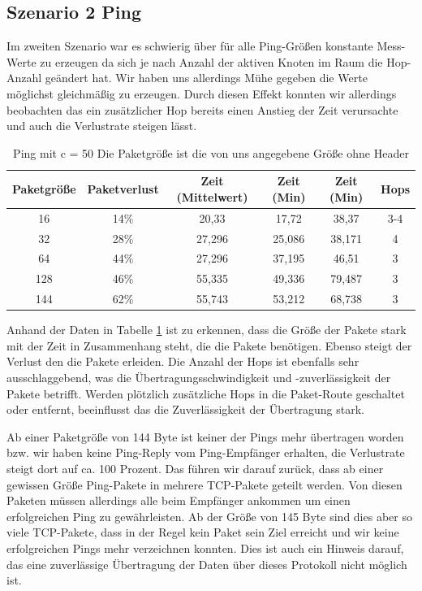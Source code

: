 \documentclass[]{scrartcl}
\begin{document}
\subsection{Szenario 2 Ping}

Im zweiten Szenario war es schwierig über für alle Ping-Größen konstante Mess-Werte zu erzeugen da sich je nach Anzahl der aktiven Knoten im Raum die Hop-Anzahl geändert hat. Wir haben uns allerdings Mühe gegeben die Werte möglichst gleichmäßig zu erzeugen. Durch diesen Effekt konnten wir allerdings beobachten das ein zusätzlicher Hop bereits einen Anstieg der Zeit verursachte und auch die Verlustrate steigen lässt.

\begin{table}[H]
\centering
\begin{tabular}{|c|c|c|c|c|c|}
  \hline
  \textbf{Paketgröße} & \textbf{Paketverlust} & \textbf{Zeit (Mittelwert)} & \textbf{Zeit (Min)} & \textbf{Zeit (Min)} & \textbf{Hops} \\
  \hline
   16 & 14\% & 20,33 & 17,72 & 38,37 & 3-4\\
  \hline
   32 & 28\% & 27,296 & 25,086 & 38,171 & 4\\
  \hline
   64 & 44\% & 27,296 & 37,195 & 46,51 & 3\\
  \hline
   128 & 46\% & 55,335 & 49,336 & 79,487 & 3\\
  \hline
   144 & 62\% & 55,743 & 53,212 & 68,738 & 3\\
  \hline
\end{tabular}
	\caption{Ping mit c = 50 Die Paketgröße ist die von uns angegebene Größe ohne Header}
	\label{table_ping_result_scenario2}
\end{table}

Anhand der Daten in Tabelle \ref{table_ping_result_scenario2} ist zu erkennen, dass die Größe der Pakete stark mit der Zeit in Zusammenhang steht, die die Pakete benötigen. Ebenso steigt der Verlust den die Pakete erleiden. Die Anzahl der Hops ist ebenfalls sehr ausschlaggebend, was die Übertragungsschwindigkeit und -zuverlässigkeit der Pakete betrifft. Werden plötzlich zusätzliche Hops in die Paket-Route geschaltet oder entfernt, beeinflusst das die Zuverlässigkeit der Übertragung stark.

Ab einer Paketgröße von 144 Byte ist keiner der Pings mehr übertragen worden bzw. wir haben keine Ping-Reply vom Ping-Empfänger erhalten, die Verlustrate steigt dort auf ca. 100 Prozent. Das führen wir darauf zurück, dass ab einer gewissen Größe Ping-Pakete in mehrere TCP-Pakete geteilt werden. Von diesen Paketen müssen allerdings alle beim Empfänger ankommen um einen erfolgreichen Ping zu gewährleisten. Ab der Größe von 145 Byte sind dies aber so viele TCP-Pakete, dass in der Regel kein Paket sein Ziel erreicht und wir keine erfolgreichen Pings mehr verzeichnen konnten. Dies ist auch ein Hinweis darauf, das eine zuverlässige Übertragung der Daten über dieses Protokoll nicht möglich ist.
\end{document}
